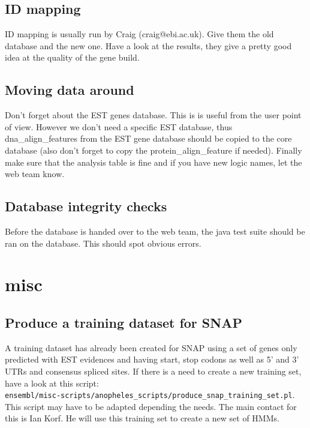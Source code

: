\documentclass[a4paper,10pt]{article}
\begin{document}
\subsection{ID mapping}
ID mapping is usually run by Craig (craig@ebi.ac.uk). Give them the old database and the new one. Have a look at the results, they give a pretty good idea at the quality of the gene build.

\subsection{Moving data around}
Don't forget about the EST genes database. This is is useful from the user point of view. However we don't need a specific EST database, thus dna\_align\_features from the EST gene database should be copied to the core database (also don't forget to copy the protein\_align\_feature if needed). Finally make sure that the analysis table is fine and if you have new logic names, let the web team know.

\subsection{Database integrity checks}
Before the database is handed over to the web team, the java test suite should be ran on the database. This should spot obvious errors.

\section{misc}
\subsection{Produce a training dataset for SNAP}
A training dataset has already been created for SNAP using a set of genes only predicted with EST evidences and having start, stop codons as well as 5' and 3' UTRs and consensus spliced sites. If there is a need to create a new training set, have a look at this script:\\
 \texttt{ensembl/misc-scripts/anopheles\_scripts/produce\_snap\_training\_set.pl}. This script may have to be adapted depending the needs.
The main contact for this is Ian Korf. He will use this training set to create a new set of HMMs.
\end{document}

